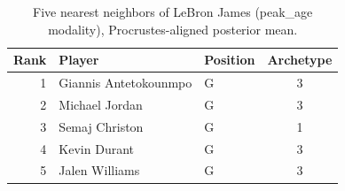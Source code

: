 \begin{table}[htbp]
  \centering\small
  \begin{tabular}{rllc}
    \toprule
    Rank & Player & Position & Archetype \\
    \midrule
    1 & Giannis Antetokounmpo & G & 3 \\
    2 & Michael Jordan & G & 3 \\
    3 & Semaj Christon & G & 1 \\
    4 & Kevin Durant & G & 3 \\
    5 & Jalen Williams & G & 3 \\
    \bottomrule
  \end{tabular}
  \caption{Five nearest neighbors of LeBron James (peak_age modality), Procrustes-aligned posterior mean.}
  \label{tab:LeBron_James_neighbors_peak_age}
\end{table}

